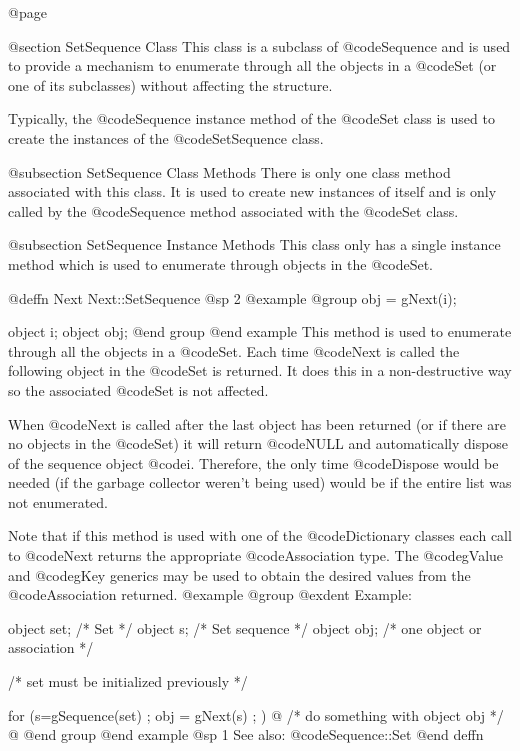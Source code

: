 @page

@section SetSequence Class
This class is a subclass of @code{Sequence} and is used to provide a
mechanism to enumerate through all the objects in a @code{Set} (or one
of its subclasses) without affecting the structure.

Typically, the @code{Sequence} instance method of the @code{Set} class
is used to create the instances of the @code{SetSequence} class.  



@subsection SetSequence Class Methods
There is only one class method associated with this class.  It is used
to create new instances of itself and is only called by the @code{Sequence}
method associated with the @code{Set} class.

@subsection SetSequence Instance Methods
This class only has a single instance method which is used to enumerate
through objects in the @code{Set}.






@deffn {Next} Next::SetSequence
@sp 2
@example
@group
obj = gNext(i);

object  i;
object  obj;
@end group
@end example
This method is used to enumerate through all the objects in a @code{Set}.
Each time @code{Next} is called the following object in the @code{Set}
is returned.  It does this in a non-destructive way so the associated
@code{Set} is not affected.

When @code{Next} is called after the last object has been returned (or
if there are no objects in the @code{Set}) it will return @code{NULL} and
automatically dispose of the sequence object @code{i}.  Therefore,
the only time @code{Dispose} would be needed (if the garbage collector
weren't being used) would be if the entire list was not enumerated.

Note that if this method is used with one of the @code{Dictionary} classes
each call to @code{Next} returns the appropriate @code{Association} type.
The @code{gValue} and @code{gKey} generics may be used to obtain
the desired values from the @code{Association} returned.
@example
@group
@exdent Example:

object  set;  /*  Set                        */
object  s;    /*  Set sequence               */
object  obj;  /*  one object or association  */

/*  set must be initialized previously  */

for (s=gSequence(set) ; obj = gNext(s) ; )  @{
        /*  do something with object obj  */
@}
@end group
@end example
@sp 1
See also:  @code{Sequence::Set}
@end deffn



